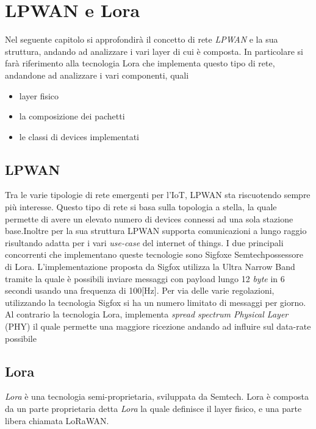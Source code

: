 \chapter{LPWAN e Lora}
Nel seguente capitolo si approfondirà il concetto di rete \emph{LPWAN} e la sua
struttura, andando ad analizzare i vari layer di cui è composta. 
In particolare si farà riferimento alla tecnologia Lora che implementa questo
tipo di rete, andandone ad analizzare i vari componenti, quali
\begin{itemize}
\item layer fisico
\item la composizione dei pachetti 
\item le classi di devices implementati
\end{itemize}

\section{LPWAN}
Tra le varie tipologie di rete emergenti per l'IoT, LPWAN sta riscuotendo sempre
più interesse. Questo tipo di rete si basa sulla topologia a stella, la quale
permette di avere un elevato numero di devices connessi ad una sola stazione
base.Inoltre per la sua struttura LPWAN supporta comunicazioni a lungo raggio
risultando adatta per i vari \emph{use-case} del internet of things. I due
principali concorrenti che implementano queste tecnologie sono Sigfox\tm e
Semtech\tm possessore di Lora\tm. L'implementazione proposta da Sigfox utilizza
la Ultra Narrow Band tramite la quale è possibili inviare messaggi con payload
lungo 12 \emph{byte} in 6 secondi usando una frequenza di 100[Hz]. Per via delle
varie regolazioni, utilizzando la tecnologia Sigfox si ha un numero limitato di
messaggi per giorno.
Al contrario la tecnologia Lora, implementa \emph{spread spectrum Physical
Layer} (PHY) il quale permette una maggiore ricezione andando ad influire sul
data-rate possibile

\section{Lora}
\emph{Lora} è una tecnologia semi-proprietaria, sviluppata da Semtech. Lora è
composta da un parte proprietaria detta \emph{Lora}\cite{LoRaCss101} la quale definisce il layer
fisico, e una parte libera chiamata LoRaWAN\cite{LoRaWAN101}.


